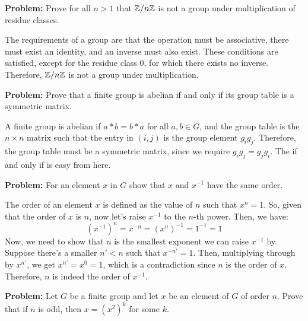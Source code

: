 \documentclass[10pt]{article}
\newenvironment{problem}{\textbf{Problem:}}{}
\begin{document}
	\begin{problem}
		Prove for all \( n > 1 \) that \( \mathbb Z / n\mathbb Z \) is not a group under multiplication of residue classes. 
	\end{problem}

	\begin{solution}
		The requirements of a group are that the operation must be associative, there must exist an identity, and an 
		inverse must also exist. These conditions are satisfied, except for the residue class \( 0 \), for which 
		there exists no inverse. Therefore, \( \mathbb Z / n\mathbb Z  \) is not a group under multiplication. 
	\end{solution}

	\begin{problem}
		Prove that a finite group is abelian if and only if its group table is a symmetric matrix. 
	\end{problem}

	\begin{solution}
		A finite group is abelian if \( a * b = b* a \) for all \( a, b \in G\), and the group table is the 
		\( n \times n \) matrix such that the entry in \( (i, j) \) is the group element \( g_i g_j \). Therefore, 
		the group table must be a symmetric matrix, since we require \( g_i g_j= g_j g_i \). The if and only if is 
		easy from here. 
	\end{solution}

	\begin{problem}
		For an element \( x \) in \( G \) show that \( x \) and \( x^{-1} \) have the same order. 
	\end{problem}

	\begin{solution}
		The order of an element \( x \) is defined as the value of \( n \) such that \( x^{n} = 1 \). So, given 
		that the order of \( x \) is \( n \), now let's raise \( x^{-1} \) to the \( n \)-th power. Then, we 
		have:
		\[
			(x^{-1})^{n} = x^{-n} = (x^{n})^{-1} = 1^{-1} = 1
		\] 
		Now, we need to show that \( n \) is the smallest exponent we can raise \( x^{-1} \) by. Suppose there's 
		a smaller \( n' < n \) such that \( x^{-n'} = 1 \). Then, multiplying through by \( x^{n'} \), we get
		\( x^{n'} = x^{0} = 1 \), which is a contradiction since \( n \) is the order of \( x \). Therefore, \( n \)
		is indeed the order of \( x^{-1} \). 
	\end{solution}

	\begin{problem}
		Let \( G \) be a finite group and let \( x \) be an element of \( G \) of order \( n \). Prove that 
		if \( n \) is odd, then \( x = (x^2)^{k} \) for some \( k \). 
	\end{problem}
\end{document}
